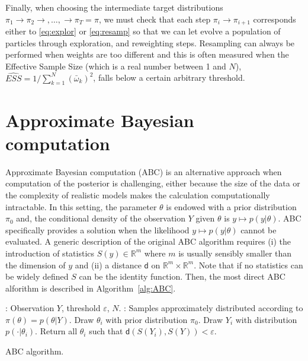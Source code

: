 \documentclass[english,graybox,envcountchap,envcountsame,sectrefs,shortlabels]{svmono}
\theoremstyle{style}
\begin{document}
Finally, when choosing the intermediate target distributions $\pi_1\rightarrow \pi_2\rightarrow,\ldots,\rightarrow \pi_T=\pi$, we must check that each step $\pi_i \rightarrow \pi_{i+1}$ corresponds either to \eqref{eq:explor} or \eqref{eq:resamp} so that we can let evolve a population of particles through exploration, and reweighting steps. Resampling can always be performed when weights are too different and this is often measured when the Effective Sample Size (which is a real number between 1 and $N$), $\widehat{ESS}=1/\sum_{k=1}^N (\bar \omega_k)^2$, falls below a certain arbitrary threshold.



\section{Approximate Bayesian computation}
Approximate Bayesian computation (ABC) is an alternative approach when computation of the posterior is challenging, either because the size of the data or the complexity of realistic models makes the calculation computationally intractable. In this setting, the parameter $\theta$ is endowed with a prior distribution $\pi_0$ and, the conditional density of the observation $Y$ given $\theta$ is $y\mapsto p(y|\theta)$. ABC specifically provides a solution  when the likelihood $y\mapsto p(y|\theta)$ cannot be evaluated. A generic description of the original ABC algorithm requires (i) the introduction of statistics $S(y)\in\mathbb{R}^m$ where $m$ is usually sensibly smaller than the dimension of $y$ and (ii) a distance $\mathsf{d}$ on $\mathbb{R}^m\times \mathbb{R}^m$. Note that if no statistics can be widely defined $S$ can be the identity function. Then, the most direct ABC alforithm is described in Algorithm~\ref{alg:ABC}.

\medskip

\begin{algorithm}
\centering
\begin{algorithmic}
: Observation $Y$, threshold $\varepsilon$, $N$.
: Samples approximately distributed according to $\pi(\theta) = p(\theta | Y)$.
\State Draw $\theta_i$ with prior distribution $\pi_0$.
\State Draw $Y_i$ with distribution  $p(\cdot |\theta_i)$.
\EndFor
\State Return all $\theta_i$ such that $\mathsf{d}(S(Y_i),S(Y))<\varepsilon$.
\end{algorithmic}
\label{alg:ABC}
\caption{ABC algorithm.}
\end{algorithm}
\end{document}
